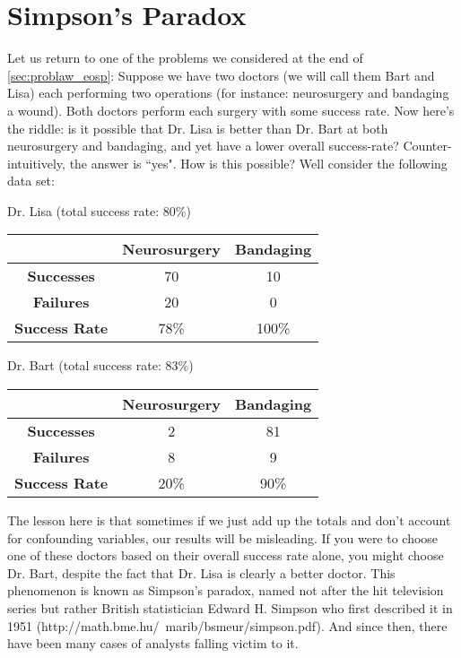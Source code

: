 \documentclass{report}
\begin{document}
\section{Simpson's Paradox}
Let us return to one of the problems we considered at the end of \ref{sec:problaw_eosp}: Suppose we have two doctors (we will call them Bart and Lisa) each performing two operations (for instance: neurosurgery and bandaging a wound). Both doctors perform each surgery with some success rate. Now here's the riddle: is it possible that Dr. Lisa is better than Dr. Bart at both neurosurgery and bandaging, and yet have a lower overall success-rate? Counter-intuitively, the answer is ``yes". How is this possible? Well consider the following data set:
\vspace{15px}
\begin{center}
Dr. Lisa (total success rate: 80\%)\\
\vspace{5px}
\begin{tabular}{c|cc }
& \textbf{Neurosurgery} & \textbf{Bandaging} \\ 
\hline
\textbf{Successes} & 70 & 10 \\  
\textbf{Failures} & 20 & 0 \\
\hline
\textbf{Success Rate} & 78\% & 100\% 
\end{tabular}
\end{center}

\vspace{15px}
\begin{center}
Dr. Bart (total success rate: 83\%)\\
\vspace{5px}
\begin{tabular}{c|cc}
&\textbf{Neurosurgery} & \textbf{Bandaging} \\ 
\hline
\textbf{Successes} & 2 & 81 \\  
\textbf{Failures} & 8 & 9 \\
\hline
\textbf{Success Rate} & 20\% & 90\% 
\end{tabular}
\vspace{15px}
\end{center}

The lesson here is that sometimes if we just add up the totals and don't account for confounding variables, our results will be misleading. If you were to choose one of these doctors based on their overall success rate alone, you might choose Dr. Bart, despite the fact that Dr. Lisa is clearly a better doctor. This phenomenon is known as Simpson's paradox, named not after the hit television series but rather British statistician Edward H. Simpson who first described it in 1951 (\todo http://math.bme.hu/~marib/bsmeur/simpson.pdf). And since then, there have been many cases of analysts falling victim to it.
\end{document}
